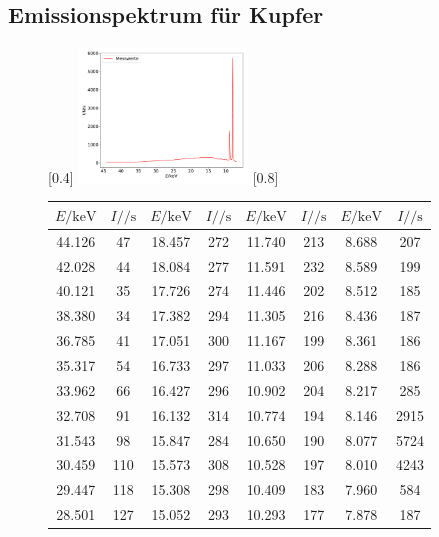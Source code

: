\subsection{Emissionspektrum für Kupfer}
\begin{figure}[h]
  \centering
  [0.4\textwidth]{
  \includegraphics[width=0.4\textwidth]{emission.pdf}
  }
  \hfill
  [0.8\textwidth]{
    \begin{tabular}{c c c c c c c c}
      \toprule
      $E / \si{\kilo\electronvolt}$ & $I / \si{\per\second}$ & $E / \si{\kilo\electronvolt}$ & $I / \si{\per\second}$ &
      $E / \si{\kilo\electronvolt}$ & $I / \si{\per\second}$ & $E / \si{\kilo\electronvolt}$ & $I / \si{\per\second}$ \\
      \midrule
      44.126 & 47 & 18.457 & 272 & 11.740 & 213 & 8.688 & 207 \\
      42.028 & 44 & 18.084 & 277 & 11.591 & 232 & 8.589 & 199 \\
      40.121 & 35 & 17.726 & 274 & 11.446 & 202 & 8.512 & 185 \\
      38.380 & 34 & 17.382 & 294 & 11.305 & 216 & 8.436 & 187 \\
      36.785 & 41 & 17.051 & 300 & 11.167 & 199 & 8.361 & 186 \\
      35.317 & 54 & 16.733 & 297 & 11.033 & 206 & 8.288 & 186 \\
      33.962 & 66 & 16.427 & 296 & 10.902 & 204 & 8.217 & 285 \\
      32.708 & 91 & 16.132 & 314 & 10.774 & 194 & 8.146 & 2915 \\
      31.543 & 98 & 15.847 & 284 & 10.650 & 190 & 8.077 & 5724 \\
      30.459 & 110 & 15.573 & 308 & 10.528 & 197 & 8.010 & 4243 \\
      29.447 & 118 & 15.308 & 298 & 10.409 & 183 & 7.960 & 584 \\
      28.501 & 127 & 15.052 & 293 & 10.293 & 177 & 7.878 & 187 \\

\end{tabular}}
\end{figure}
